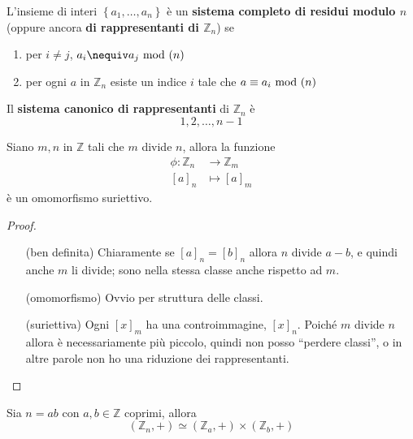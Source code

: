 \begin{definizione}
	L'insieme di interi $\left\{a_1,\dots,a_n\right\}$ è un \textbf{sistema completo di residui modulo $n$} (oppure ancora \textbf{di rappresentanti di $\mathbb{Z}_n$}) se
	\begin{enumerate}
		\item per $i\neq j$, $a_i\nequiv a_j \Mod(n)$
		\item per ogni $a$ in $\mathbb{Z}_n$ esiste un indice $i$ tale che $a\equiv a_i \ \mathrm{mod}\ (n)$
	\end{enumerate}
Il \textbf{sistema canonico di rappresentanti} di $\mathbb{Z}_n$ è
\begin{equation*}
1,2,\dots,n-1
\end{equation*}
\end{definizione}
\begin{proposizione}
	Siano $m,n$ in $\mathbb{Z}$ tali che $m$ divide $n$, allora la funzione
	\begin{align*}
	\phi:\mathbb{Z}_n&\longrightarrow\mathbb{Z}_m\\
	[a]_n&\longmapsto[a]_m
	\end{align*}
	è un omomorfismo suriettivo.
\end{proposizione}
\begin{proof}\
	\begin{itemize}
		\item[(ben definita)] Chiaramente se $[a]_n=[b]_n$ allora $n$ divide $a-b$, e quindi anche $m$ li divide; sono nella stessa classe anche rispetto ad $m$.
		\item[(omomorfismo)] Ovvio per struttura delle classi.
		\item[(suriettiva)] Ogni $[x]_m$ ha una controimmagine, $[x]_n$. Poiché $m$ divide $n$ allora è necessariamente più piccolo, quindi non posso \enquote{perdere classi}, o in altre parole non ho una riduzione dei rappresentanti. 
	\end{itemize}
\end{proof}
\begin{proposizione}
	\label{prod_ciclici}
	Sia $n=ab$ con $a,b\in\mathbb{Z}$ coprimi, allora 
	\begin{equation*}
	(\mathbb{Z}_n,+)\simeq(\mathbb{Z}_a,+)\times(\mathbb{Z}_b,+)
	\end{equation*}
\end{proposizione}
